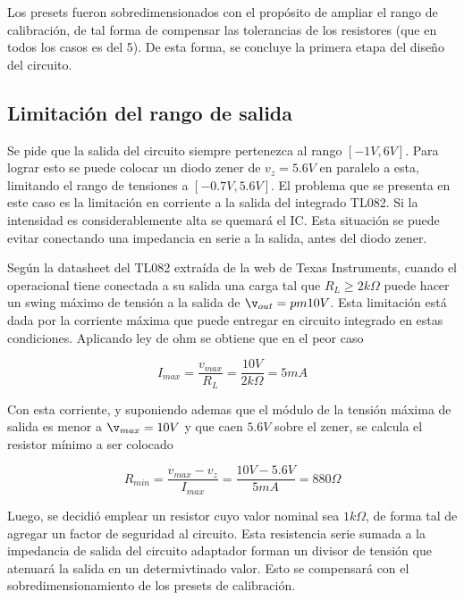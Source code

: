 Los presets fueron sobredimensionados con el prop\'osito de ampliar el rango de calibraci\'on, de tal forma de compensar las tolerancias de los resistores (que en todos los casos es del 5\percent).
 De esta forma, se concluye la primera etapa del diseño del circuito.

 \subsection{Limitaci\'on del rango de salida}

 Se pide que la salida del circuito siempre pertenezca al rango $[-1V , 6V]$. Para lograr esto se puede colocar un diodo zener de $v_z = 5.6 V$ en paralelo a esta, limitando el rango de tensiones a $[-0.7V , 5.6V]$.
  El problema que se presenta en este caso es la limitación en corriente a la salida del integrado TL082. Si la intensidad es considerablemente alta se quemar\'a el IC. 
  Esta situaci\'on se puede evitar conectando una impedancia en serie a la salida, antes del diodo zener.


Seg\'un la datasheet del TL082 extra\'ida de la web de Texas Instruments, cuando el operacional tiene conectada a su salida una carga tal que $R_L \geq 2k\Omega$ puede hacer un swing m\'aximo de tensi\'on a la salida de $\v_{out} = pm10V$.
 Esta limitaci\'on est\'a dada por la corriente m\'axima que puede entregar en circuito integrado en estas condiciones. Aplicando ley de ohm se obtiene que en el peor caso

 \begin{equation}
    I_{max} = \frac{v_{max}}{R_L} = \frac{10V}{2k\Omega} = 5mA
    \label{fig:EJ6_ecuacion_corriente}
\end{equation}

Con esta corriente, y suponiendo ademas que el m\'odulo de la tensi\'on m\'axima de salida es menor a  $\v_{max} = 10V$ y que caen $5.6V$ sobre el zener, se calcula el resistor m\'inimo a ser colocado

\begin{equation}
    R_{min} = \frac{v_{max}-v_{z}}{I_{max}} = \frac{10V - 5.6V}{5mA} = 880\Omega
    \label{fig:EJ6_ecuacion_resistor_serie}
\end{equation}

Luego, se decidi\'o emplear un resistor cuyo valor nominal sea $1k\Omega$, de forma tal de agregar un factor de seguridad al circuito.
 Esta resistencia serie sumada a la impedancia de salida del circuito adaptador forman un divisor de tensi\'on que atenuar\'a la salida en un determivtinado valor. Esto se compensar\'a con el sobredimensionamiento de los presets de calibraci\'on.

